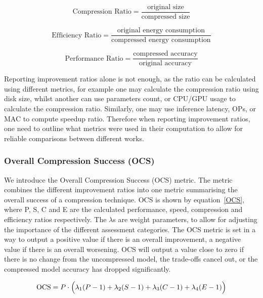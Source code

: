 \begin{equation}
  \text{Compression Ratio} =   \frac{\text{original size}}{\text{compressed size}}
  \label{compression_ratio}
\end{equation}

\begin{equation}
  \text{Efficiency Ratio} =   \frac{\text{original energy consumption}}{\text{compressed energy consumption}}
  \label{effeciency_ratio}
\end{equation}

\begin{equation}
  \text{Performance Ratio} =   \frac{\text{compressed accuracy}}{\text{original accuracy}}
  \label{performance_ratio}
\end{equation}

Reporting improvement ratios alone is not enough, as the ratio can be calculated using different metrics, for example one may calculate the compression ratio using disk size, whilst another can use parameters count, or CPU/GPU usage to calculate the compression ratio. Similarly, one may use inference latency, OPs, or MAC to compute speedup ratio.
%
Therefore when reporting improvement ratios, one need to outline what metrics were used in their computation to allow for reliable comparisons between different works.

\subsubsection{Overall Compression Success (OCS)}
We introduce the Overall Compression Success (OCS) metric. The metric combines the different improvement ratios into one metric summarising the overall success of a compression technique. 
%
OCS is shown by equation~\ref{OCS}, where P, S, C and E are the calculated performance, speed, compression and efficiency ratios respectively. 
%
The $\lambda$s are weight parameters, to allow for adjusting the importance of the different assessment categories. 
%
The OCS metric is set in a way to output a positive value if there is an overall improvement, a negative value if there is an overall  worsening. OCS will output a value close to zero if there is no change from the uncompressed model, the trade-offs cancel out, or the compressed model accuracy has dropped significantly. 

\begin{equation}
  \text{OCS} =  P \cdot \Bigl( \lambda_1 (P-1) + \lambda_2 (S-1) + \lambda_3 (C-1) + \lambda_4 (E-1) \Bigl) 
  \label{OCS}
\end{equation}

